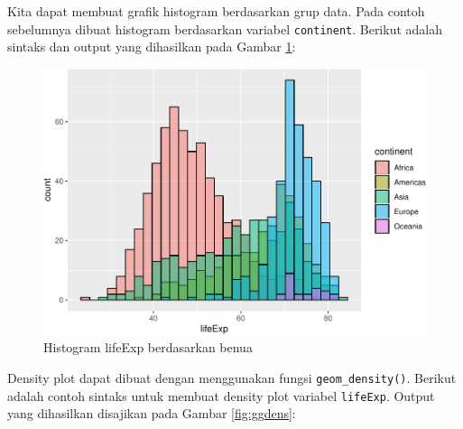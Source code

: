\documentclass[]{book}
\newenvironment{Shaded}{\begin{snugshade}}{\end{snugshade}}
\newcommand{\KeywordTok}[1]{\textcolor[rgb]{0.13,0.29,0.53}{\textbf{#1}}}
\newcommand{\DataTypeTok}[1]{\textcolor[rgb]{0.13,0.29,0.53}{#1}}
\newcommand{\FloatTok}[1]{\textcolor[rgb]{0.00,0.00,0.81}{#1}}
\newcommand{\StringTok}[1]{\textcolor[rgb]{0.31,0.60,0.02}{#1}}
\newcommand{\CommentTok}[1]{\textcolor[rgb]{0.56,0.35,0.01}{\textit{#1}}}
\newcommand{\OperatorTok}[1]{\textcolor[rgb]{0.81,0.36,0.00}{\textbf{#1}}}
\newcommand{\NormalTok}[1]{#1}
\begin{document}
Kita dapat membuat grafik histogram berdasarkan grup data. Pada contoh
sebelumnya dibuat histogram berdasarkan variabel \texttt{continent}.
Berikut adalah sintaks dan output yang dihasilkan pada Gambar
\ref{fig:gghist2}:

\begin{Shaded}
\end{Shaded}

\begin{figure}

{\centering \includegraphics[width=0.7\linewidth]{EnvStat_files/figure-latex/gghist2-1} 

}

\caption{Histogram lifeExp berdasarkan benua}\label{fig:gghist2}
\end{figure}

Density plot dapat dibuat dengan menggunakan fungsi
\texttt{geom\_density()}. Berikut adalah contoh sintaks untuk membuat
density plot variabel \texttt{lifeExp}. Output yang dihasilkan disajikan
pada Gambar \ref{fig:ggdens}:

\begin{Shaded}
\end{Shaded}
\end{document}
